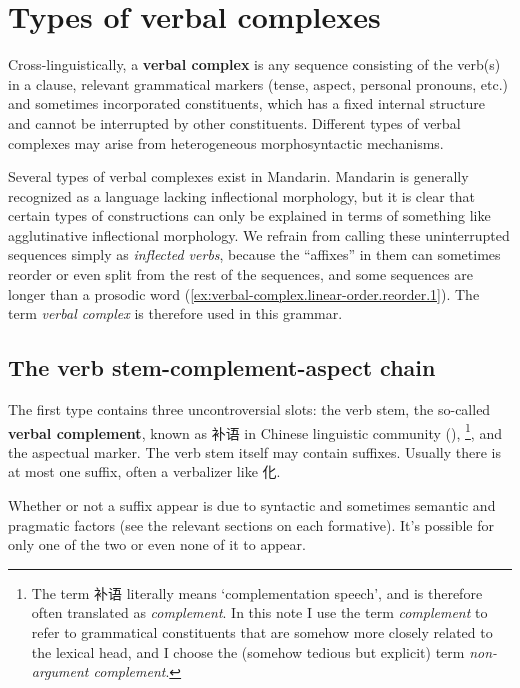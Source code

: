 \documentclass[UTF8, a4paper, oneside, scheme=plain, 12pt]{ctexrep}
\newcommand*{\concept}[1]{\textbf{#1}}
\newcommand*{\term}[1]{\emph{#1}}
\newcommand{\translate}[1]{`#1'}
\begin{document}
\section{Types of verbal complexes}\label{sec:verbal-complex.linear-order}

Cross-linguistically, a \concept{verbal complex} is
any sequence consisting of the verb(s) in a clause,
relevant grammatical markers (tense, aspect, personal pronouns, etc.)
and sometimes incorporated constituents,
which has a fixed internal structure and cannot be interrupted by other constituents.
Different types of verbal complexes may arise from
heterogeneous morphosyntactic mechanisms.

Several types of verbal complexes exist in Mandarin.
Mandarin is generally recognized as a language lacking inflectional morphology,
but it is clear that certain types of constructions
can only be explained in terms of something like agglutinative inflectional morphology.
We refrain from calling these uninterrupted sequences simply as \term{inflected verbs},
because the ``affixes'' in them can sometimes reorder or even split from the rest of the sequences,
and some sequences are longer than a prosodic word
(\ref{ex:verbal-complex.linear-order.reorder.1}).
The term \term{verbal complex} is therefore used in this grammar.

\subsection{The verb stem-complement-aspect chain}\label{sec:verbal-complex.v-c-a}

The first type contains three uncontroversial slots:
the verb stem,
the so-called \concept{verbal complement},
known as 补语 in Chinese linguistic community (),%
\footnote{
    The term 补语 literally means \translate{complementation speech}, 
    and is therefore often translated as \term{complement}.
    In this note I use the term \term{complement}
    to refer to grammatical constituents that are somehow more closely 
    related to the lexical head, 
    and I choose the (somehow tedious but explicit) term 
    \term{non-argument complement}.
},
and the aspectual marker.
The verb stem itself may contain suffixes.
Usually there is at most one suffix, often a verbalizer like 化.

Whether or not a suffix appear is due to syntactic and sometimes semantic and pragmatic factors
(see the relevant sections on each formative).
It's possible for only one of the two or even none of it to appear.
\end{document}
